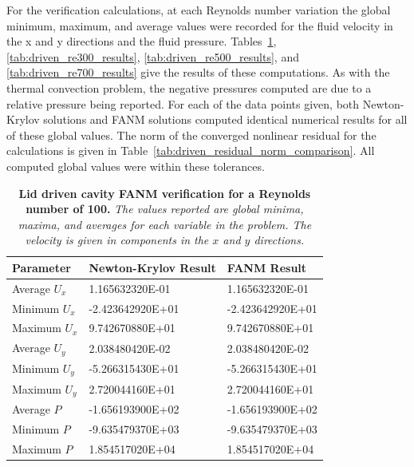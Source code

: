 For the verification calculations, at each Reynolds number variation
the global minimum, maximum, and average values were recorded for the
fluid velocity in the x and y directions and the fluid
pressure. Tables~\ref{tab:driven_re100_results},
\ref{tab:driven_re300_results}, \ref{tab:driven_re500_results}, and
\ref{tab:driven_re700_results} give the results of these
computations. As with the thermal convection problem, the negative
pressures computed are due to a relative pressure being reported. For
each of the data points given, both Newton-Krylov solutions and FANM
solutions computed identical numerical results for all of these global
values. The norm of the converged nonlinear residual for the
calculations is given in
Table~\ref{tab:driven_residual_norm_comparison}. All computed global
values were within these tolerances.

\begin{table}[h!]
  \begin{center}
    \begin{tabular}{lll}\hline\hline
      \multicolumn{1}{l}{Parameter}& 
      \multicolumn{1}{l}{Newton-Krylov Result}&
      \multicolumn{1}{l}{FANM Result}\\
      \hline
      Average $U_x$ & 1.165632320E-01 & 1.165632320E-01 \\
      Minimum $U_x$ & -2.423642920E+01 & -2.423642920E+01 \\
      Maximum $U_x$ & 9.742670880E+01 & 9.742670880E+01 \\
      \hline
      Average $U_y$ & 2.038480420E-02 & 2.038480420E-02 \\
      Minimum $U_y$ & -5.266315430E+01 & -5.266315430E+01 \\
      Maximum $U_y$ & 2.720044160E+01 & 2.720044160E+01 \\
      \hline
      Average $P$ & -1.656193900E+02 & -1.656193900E+02 \\
      Minimum $P$ & -9.635479370E+03 & -9.635479370E+03 \\
      Maximum $P$ & 1.854517020E+04 & 1.854517020E+04 \\
      \hline\hline
    \end{tabular}
  \end{center}
  \caption{\textbf{Lid driven cavity FANM verification for a Reynolds
      number of 100.} \textit{The values reported are global minima,
      maxima, and averages for each variable in the problem. The
      velocity is given in components in the $x$ and $y$ directions.}}
  \label{tab:driven_re100_results}
\end{table}

